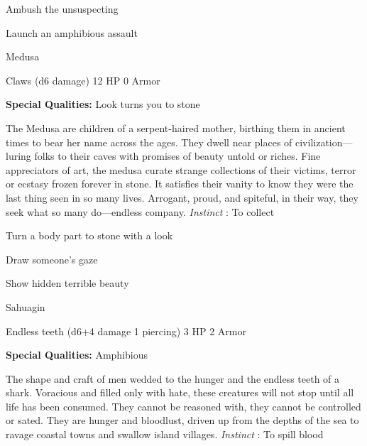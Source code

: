 \startitemize[1,packed]

\item Ambush the unsuspecting

 
\item Launch an amphibious assault


\stopitemize
 
\startMonsterName
Medusa	 
\stopMonsterName
 

Claws (d6 damage)	12 HP	0 Armor

 


 
\startMonsterQualities
{\bf Special Qualities:}  Look turns you to stone
\stopMonsterQualities
 
\startMonsterDescription
The Medusa are children of a serpent-haired mother, birthing them in ancient times to bear her name across the ages. They dwell near places of civilization—luring folks to their caves with promises of beauty untold or riches. Fine appreciators of art, the medusa curate strange collections of their victims, terror or ecstasy frozen forever in stone. It satisfies their vanity to know they were the last thing seen in so many lives. Arrogant, proud, and spiteful, in their way, they seek what so many do—endless company. {\em Instinct} : To collect
\stopMonsterDescription
 
\startitemize[1,packed]

\item Turn a body part to stone with a look

 
\item Draw someone's gaze

 
\item Show hidden terrible beauty


\stopitemize
 
\startMonsterName
Sahuagin	 
\stopMonsterName
 

Endless teeth (d6+4 damage 1 piercing)	3 HP	2 Armor

 


 
\startMonsterQualities
{\bf Special Qualities:}  Amphibious
\stopMonsterQualities
 
\startMonsterDescription
The shape and craft of men wedded to the hunger and the endless teeth of a shark. Voracious and filled only with hate, these creatures will not stop until all life has been consumed. They cannot be reasoned with, they cannot be controlled or sated. They are hunger and bloodlust, driven up from the depths of the sea to ravage coastal towns and swallow island villages. {\em Instinct} : To spill blood
\stopMonsterDescription
 
